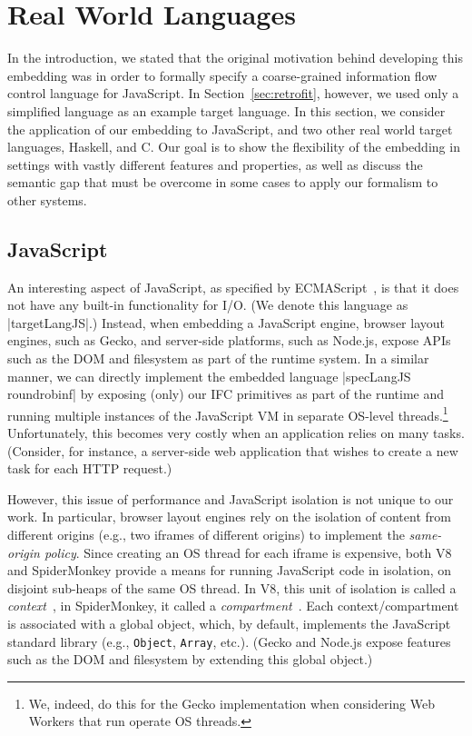 \section{Real World Languages}
\label{sec:real}

In the introduction, we stated that the original motivation behind
developing this embedding was in order to formally specify a
coarse-grained information flow control language for JavaScript.
%
In Section~\ref{sec:retrofit}, however, we used only a simplified
language as an example target language.
%
In this section, we consider the application of our embedding to
JavaScript, and two other real world target languages, Haskell, and C.
%
Our goal is to show the flexibility of the embedding in settings with
vastly different features and properties, as well as discuss the
semantic gap that must be overcome in some cases to apply our formalism
to other systems.
%



\subsection{JavaScript}
\label{sec:real:js}

An interesting aspect of JavaScript, as specified by
ECMAScript~\cite{ecma}, is that it does not have any built-in
functionality for I/O.
%
(We denote this language as |targetLangJS|.)
%
Instead, when embedding a JavaScript engine, browser layout engines,
such as Gecko, and server-side platforms, such as Node.js, expose APIs
such as the DOM and filesystem as part of the runtime system.
%
In a similar manner, we can directly implement the embedded language
|specLangJS roundrobinf| by exposing (only) our IFC primitives as part
of the runtime and running multiple instances of the JavaScript VM in
separate OS-level threads.\footnote{
  We, indeed, do this for the Gecko implementation when considering
  Web Workers that run operate OS threads.
}
%
Unfortunately, this becomes very costly when an application relies on
many tasks.
%
(Consider, for instance, a server-side web application that wishes to
create a new task for each HTTP request.)

However, this issue of performance and JavaScript isolation is not
unique to our work. 
%
In particular, browser layout engines rely on the isolation of content
from different origins (e.g., two iframes of different origins) to
implement the \emph{same-origin policy}.
%
Since creating an OS thread for each iframe is expensive, both V8 and
SpiderMonkey provide a means for running JavaScript code in isolation,
on disjoint sub-heaps of the same OS thread.
%
In V8, this unit of isolation is called a \emph{context}~\tocite{}, in
SpiderMonkey, it called a \emph{compartment}~\tocite{}.
%
Each context/compartment is associated with a global object, which, by
default, implements the JavaScript standard library (e.g.,
\verb|Object|, \verb|Array|, etc.).
%
(Gecko and Node.js expose features such as the DOM and
filesystem by extending this global object.)
%

